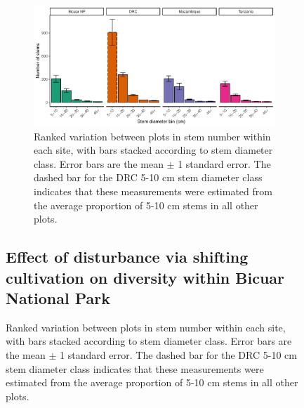 \documentclass[diversity,article,submit,moreauthors,pdftex]{Definitions/mdpi}
\begin{document}
\begin{figure}[H]
\begin{figure}[H]
\centering
	\includegraphics[width=\textwidth]{img/stem_ab_dbh_bin_group}
	\caption{Ranked variation between plots in stem number within each site, with bars stacked according to stem diameter class. Error bars are the mean $\pm$ 1 standard error. The dashed bar for the DRC 5-10 cm stem diameter class indicates that these measurements were estimated from the average proportion of 5-10 cm stems in all other plots.}
	\label{stem_ab_dbh_bin}
\end{figure}

\subsection{Effect of disturbance via shifting cultivation on diversity within Bicuar National Park}


\end{figure}
\end{document}
